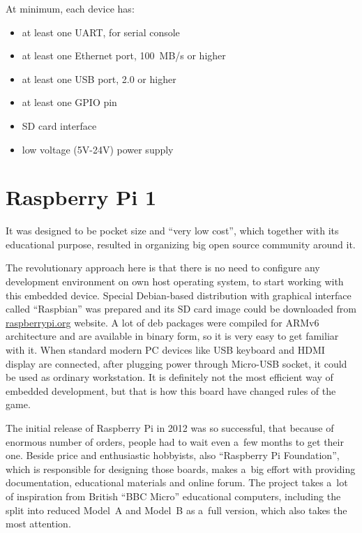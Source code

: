 \documentclass[printmode]{mgr}
\begin{document}
At minimum, each device has:
\begin{itemize}
  \item at least one UART, for serial console
  \item at least one Ethernet port, 100~MB/s or higher
  \item at least one USB port, 2.0 or higher
  \item at least one GPIO pin
  \item SD card interface
  \item low voltage (5V-24V) power supply
\end{itemize}



\section{Raspberry Pi 1}


It was designed to be pocket size and ``very low cost''\cite{web:raspberrypi-lowcost}, which together with its educational purpose, resulted in organizing big open source community around it.

The revolutionary approach here is that there is no need to configure any development environment on own host operating system, to start working with this embedded device.
Special Debian-based distribution with graphical interface called ``Raspbian'' was prepared and its SD card image could be downloaded from \url{raspberrypi.org} website.
A lot of deb packages were compiled for ARMv6 architecture and are available in binary form, so it is very easy to get familiar with it.\cite{web:raspberrypi-raspbian}
When standard modern PC devices like USB keyboard and HDMI display are connected, after plugging power through Micro-USB socket, it could be used as ordinary workstation.
It is definitely not the most efficient way of embedded development, but that is how this board have changed rules of the game.

The initial release of Raspberry Pi in 2012 was so successful, that because of enormous number of orders, people had to wait even a~few months to get their one. 
Beside price and enthusiastic hobbyists, also ``Raspberry Pi Foundation'', which is responsible for designing those boards, makes a~big effort with providing documentation, educational materials and online forum.\cite{web:raspberrypi-forum}
The project takes a~lot of inspiration from British ``BBC Micro'' educational computers, including the split into reduced Model~A and Model~B as a~full version, which also takes the most attention.
\end{document}
